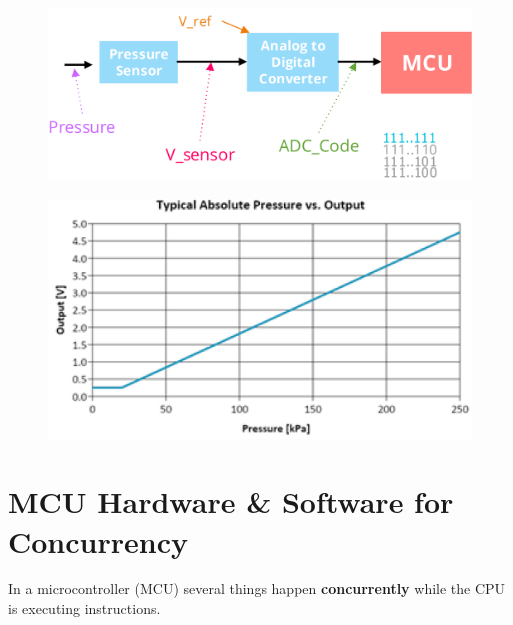   \begin{minipage}{\linewidth}
      \centering
      \begin{minipage}{0.45\linewidth}
          \begin{figure}[H]
                \centering
                \includegraphics[width=1\linewidth]{img/img5.png}
          \end{figure}
      \end{minipage}
      \hspace{0.05\linewidth}
      \begin{minipage}{0.45\linewidth}
          \begin{figure}[H]
                \centering
                \includegraphics[width=1\linewidth]{img/image5.png}
          \end{figure}
      \end{minipage}
  \end{minipage}

\section{MCU Hardware \& Software for Concurrency}

In a microcontroller (MCU) several things happen \textbf{concurrently} while the CPU is executing instructions. 

